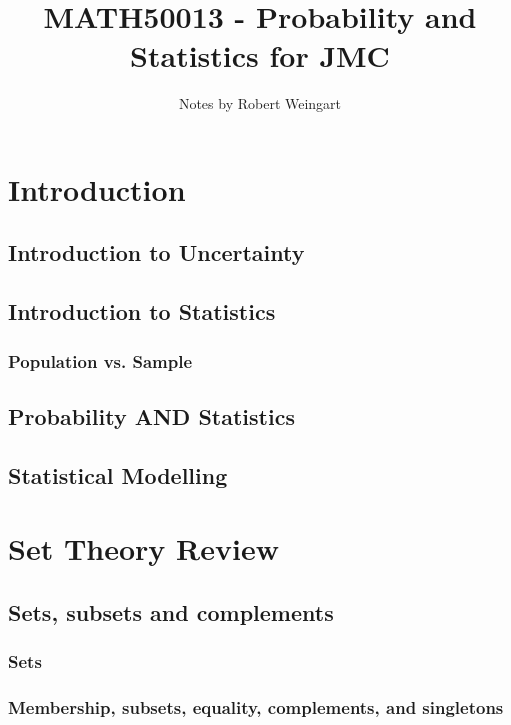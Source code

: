 \documentclass[12pt]{article}
\title{MATH50013 - Probability and Statistics for JMC}
\author{Notes by Robert Weingart}
\date{}
\theoremstyle{definition}
\begin{document}
\maketitle

\tableofcontents

\section{Introduction}

\subsection{Introduction to Uncertainty}

\subsection{Introduction to Statistics}

\subsubsection{Population vs. Sample}

\subsection{Probability AND Statistics}

\subsection{Statistical Modelling}

\section{Set Theory Review}

\subsection{Sets, subsets and complements}

\subsubsection{Sets}

\subsubsection{Membership, subsets, equality, complements, and singletons}
\end{document}
